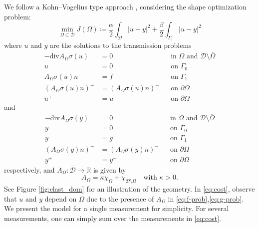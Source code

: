 \documentclass[preprint,9pt]{elsarticle}
\begin{document}
We follow a Kohn--Vogelius type approach \cite{MR739921},
considering the shape optimization problem:
\begin{equation}\label{eq:cost}
	\min_{\Omega \subset \mathcal{D}}
	J(\Omega) \coloneqq
	\frac{\alpha}{2}\int_{\mathcal{D}}|u-y|^{2} + 
	\frac{\beta}{2}\int_{\Gamma_{1}}|u-y|^{2}
\end{equation}
where $u$ and $y$ are the solutions to the transmission problems
\begin{equation} \label{eq:f-prob}
	\begin{aligned}
    -\mathrm{div} A_{\Omega} \sigma(u) &= 0 && \text{in } \Omega \text{ and } \mathcal{D}\setminus\overline{\Omega} \\
                                     u &= 0 && \text{on } \Gamma_{0} \\
                 A_{\Omega} \sigma(u)n &= f && \text{on } \Gamma_{1}   \\
		     (A_{\Omega} \sigma(u)n)^+ &= (A_{\Omega} \sigma(u)n)^- && \text{on } \partial\Omega\\      
				                   u^+ &= u^- && \text{on }  \partial\Omega      				              
	\end{aligned}	
\end{equation}
and
\begin{equation} \label{eq:g-prob}
	\begin{aligned}
    -\mathrm{div} A_{\Omega} \sigma(y) &= 0 && \text{in } \Omega  \text{ and } \mathcal{D}\setminus\overline \Omega \\
                                     y &= 0 && \text{on } \Gamma_{0} \\
                                     y &= g && \text{on } \Gamma_{1}   \\
			 (A_{\Omega} \sigma(y)n)^+ &= (A_{\Omega} \sigma(y)n)^- && \text{on } \partial\Omega\\      
								   y^+ &= y^- && \text{on } \partial\Omega       
	\end{aligned}
\end{equation}
respectively, and $A_{\Omega}\colon\overline{\mathcal{D}} \to \mathds{R}$ is given by
\begin{equation}\label{eq:AOmega}
A_{\Omega} = \kappa\chi_{\Omega} + \chi_{\overline{\mathcal{D}}\setminus\Omega}
\quad \text{with }\kappa>0.
\end{equation}
See Figure \ref{fig:elast_dom} for an illustration of the geometry.
In \eqref{eq:cost}, observe that $u$ and $y$ depend on $\Omega$ due to
the presence of $A_\Omega$ in \eqref{eq:f-prob},\eqref{eq:g-prob}.
We present the model for a single measurement for simplicity. 
For several measurements, one can simply sum over the measurements in \eqref{eq:cost}.
\end{document}
